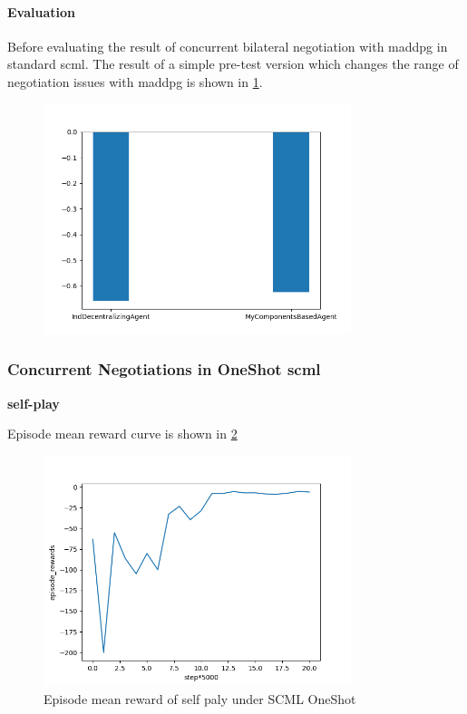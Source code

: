 \paragraph{Evaluation} Before evaluating the result of concurrent bilateral negotiation with \gls{maddpg} in standard \gls{scml}. The result of a simple pre-test version which changes the range of negotiation issues with \gls{maddpg}
is shown in \ref{fig:dynamical-range-issues-maddpg}.

\begin{figure}[htbp]
\centering
\includegraphics[width=0.80\textwidth]{./images/dynamic_range_issues_maddpg.png}
\caption{}
\label{fig:dynamical-range-issues-maddpg}
\end{figure}


\subsubsection{Concurrent Negotiations in OneShot \gls{scml}}
\textbf{self-play}

Episode mean reward curve is shown in \ref{fig:oneshot-self-play}

\begin{figure}[htbp]
\centering
\includegraphics[width=0.80\textwidth]{./images/oneshot_self_play.png}
\caption{Episode mean reward of self paly under SCML OneShot}
\label{fig:oneshot-self-play}
\end{figure}

